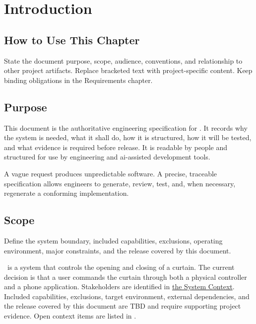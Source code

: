 \chapter{Introduction}

\section{How to Use This Chapter}
State the document purpose, scope, audience, conventions, and relationship to
other project artifacts. Replace bracketed text with project-specific content.
Keep binding obligations in the Requirements chapter.

\section{Purpose}
This document is the authoritative engineering specification for
\ProjectName. It records why the system is needed, what it shall do, how it is
structured, how it will be tested, and what evidence is required before
release. It is readable by people and structured for use by engineering and
\gls{ai}-assisted development tools.

\begin{dsnNote}
A vague request produces unpredictable software. A precise, traceable
specification allows engineers to generate, review, test, and, when necessary,
regenerate a conforming implementation.
\end{dsnNote}

\section{Scope}
Define the system boundary, included capabilities, exclusions, operating
environment, major constraints, and the release covered by this document.

\ProjectName\ is a system that controls the opening and closing of a
curtain. The current decision is that a user commands the curtain through
both a physical controller and a phone application. Stakeholders are identified in
\hyperref[Section:Stakeholders]{the System Context}. Included capabilities,
exclusions, target environment, external dependencies, and the release covered by this document
are TBD and require supporting project evidence. Open context items are
listed in .

